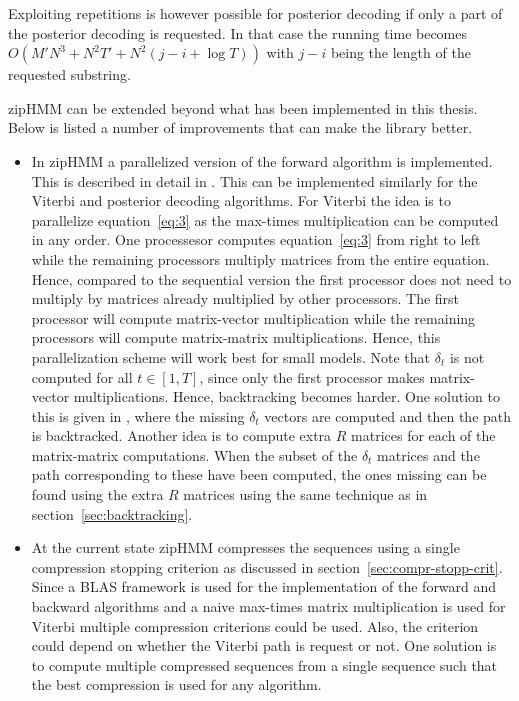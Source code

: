 Exploiting repetitions is however possible for posterior decoding if only a
part of the posterior decoding is requested. In that case the running time
becomes $O(M' N^3 + N^2 T' + N^2 (j - i + \log T))$ with $j - i$ being the
length of the requested substring.

zipHMM can be extended beyond what has been implemented in this thesis. Below
is listed a number of improvements that can make the library better.
\begin{itemize}
\item In zipHMM a parallelized version of the forward algorithm is implemented.
  This is described in detail in \citet{sand2014engineering}. This can be
  implemented similarly for the Viterbi and posterior decoding algorithms. For
  Viterbi the idea is to parallelize equation~\eqref{eq:3} as the max-times
  multiplication can be computed in any order. One processesor computes
  equation~\eqref{eq:3} from right to left while the remaining processors
  multiply matrices from the entire equation. Hence, compared to the sequential
  version the first processor does not need to multiply by matrices already
  multiplied by other processors. The first processor will compute
  matrix-vector multiplication while the remaining processors will compute
  matrix-matrix multiplications. Hence, this parallelization scheme will work
  best for small models. Note that $\delta_t$ is not computed for all
  $t \in [1, T]$, since only the first processor makes matrix-vector
  multiplications. Hence, backtracking becomes harder. One solution to this is
  given in \citet{sand2014engineering}, where the missing $\delta_t$ vectors
  are computed and then the path is backtracked. Another idea is to compute
  extra $R$ matrices for each of the matrix-matrix computations. When the
  subset of the $\delta_t$ matrices and the path corresponding to these have
  been computed, the ones missing can be found using the extra $R$ matrices
  using the same technique as in section~\ref{sec:backtracking}.
\item At the current state zipHMM compresses the sequences using a single
  compression stopping criterion as discussed in
  section~\ref{sec:compr-stopp-crit}. Since a BLAS framework is used for the
  implementation of the forward and backward algorithms and a naive max-times
  matrix multiplication is used for Viterbi multiple compression criterions
  could be used. Also, the criterion could depend on whether the Viterbi path
  is request or not. One solution is to compute multiple compressed sequences
  from a single sequence such that the best compression is used for any algorithm.

\end{itemize}
